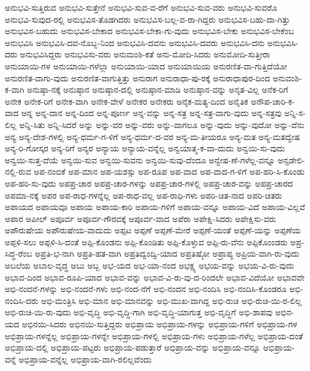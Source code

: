 {ಅನುಭವಿ-ಸುತ್ತಿರುವ
ಅನುಭವಿ-ಸುತ್ತೇನೆ
ಅನುಭವಿ-ಸುವ-ವ-ರೆಗೆ
ಅನುಭವಿ-ಸುವ-ವರು
ಅನುಭವಿ-ಸುವರೊ
ಅನುಭವಿ-ಸುವುದ-ರಲ್ಲಿ
ಅನುಭವಿಸ-ತೊಡಗಿದರು
ಅನುಭವಿಸ-ಬಲ್ಲ-ವ-ರಾ-ಗಿದ್ದರು
ಅನುಭವಿಸ-ಬಹು-ದಾ-ಗಿತ್ತು
ಅನುಭವಿಸ-ಬಹುದು
ಅನುಭವಿಸ-ಬೇಕಾದ
ಅನುಭವಿಸ-ಬೇಕಾ-ಗು-ವುದು
ಅನುಭವಿಸ-ಬೇಕು
ಅನುಭವಿಸ-ಬೇಕೆಂಬ
ಅನುಭವಿಸಿ
ಅನುಭವಿಸಿ-ದವ-ನೊಬ್ಬ-ನಿಂದ
ಅನುಭವಿಸಿ-ದವನು
ಅನುಭವಿಸಿ-ದವರು
ಅನುಭವಿಸಿ-ದನು
ಅನುಭವಿಸಿ-ದರು
ಅನುಭವಿಸಿದ್ದರು
ಅನುಭವಿಸು-ವರು
ಅನುಮಂಶಿ-ಕತೆ
ಅನು-ಮೋದಿ-ಸಿದರು
ಅನುಮೋದಿ-ಸುತ್ತೀರಾ
ಅನುಯಾಯಿ-ಗಳ
ಅನುಯಾಯಿ-ಗಳೆಲ್ಲಾ
ಅನುಯಾಯಿ-ಯಾದ
ಅನುಯಾಯಿಯ
ಅನುರಣಿತ-ವಾ-ಗುತ್ತಿದೆಯೋ
ಅನುರಣಿತ-ವಾಗು-ವುದು
ಅನುರಣಿತ-ವಾಗುತ್ತಿತ್ತು
ಅನುರಾಗ
ಅನುರಾಧಾ-ಪು-ರಕ್ಕೆ
ಅನುರಾಧಾಪುರ-ದಿಂದ
ಅನುವಂಶಿ-ಕ-ವಾಗಿ
ಅನುಷ್ಠಾ-ನಕ್ಕೆ
ಅನುಷ್ಠಾನ
ಅನುಷ್ಠಾನ-ದಲ್ಲಿ
ಅನುಷ್ಠಾನ-ಮಾಡಿ
ಅನುಷ್ಠಾನ-ವನ್ನು
ಅನೃತ-ವಿಲ್ಲ
ಅನೆಕ-ರಿಗೆ
ಅನೇಕ
ಅನೇಕ-ರಿಗೆ
ಅನೇಕ-ವಾಗಿ
ಅನೇಕ-ವೇಳೆ
ಅನೇಕರ
ಅನೇಕರು
ಅನೈಕ-ಮತ್ಯ-ದಿಂದ
ಅನೈತಿಕ
ಅನೌಪ-ಚಾರಿ-ಕ-ವಾದ
ಅನ್ನ
ಅನ್ನ-ದಾನ
ಅನ್ನ-ದಿಂದ
ಅನ್ನ-ಪೂರ್ಣ
ಅನ್ನ-ವನ್ನು
ಅನ್ನ-ಸತ್ರ
ಅನ್ನ-ಸತ್ರ-ವಾಗು-ವುದು
ಅನ್ನ-ಸತ್ರವು
ಅನ್ನಿ-ಸ-ಲಿಲ್ಲ
ಅನ್ನಿ-ಸಿತು
ಅನ್ನಿ-ಸಿದರೆ
ಅನ್ನು
ಅನ್ನು-ವರ
ಅನ್ನು-ವರು
ಅನ್ನು-ವಾಗಲೂ
ಅನ್ನು-ವುದು
ಅನ್ನು-ವುದೋ
ಅನ್ನು-ವೆನು
ಅನ್ಯ
ಅನ್ಯ-ದೇಶ-ಗಳಲ್ಲಿ
ಅನ್ಯ-ಧರ್ಮ-ಗ-ಳಿಗೆ
ಅನ್ಯ-ಧರ್ಮ-ದ-ವರ
ಅನ್ಯ-ಮ-ತೀಯರೂ
ಅನ್ಯ-ಮತ
ಅನ್ಯ-ಮತದ್ವೇಷ
ಅನ್ಯ-ರಿ-ಗೋಸ್ಕರ
ಅನ್ಯ-ರಿಗೆ
ಅನ್ಯರ
ಅನ್ಯಾಯ
ಅನ್ಯಾಯ-ವನ್ನೆಲ್ಲ
ಅನ್ವಯಾತ್ಮ-ಕ-ವಾ-ದುದು
ಅನ್ವಯಿ-ಸು-ವುದು
ಅನ್ವಯಿ-ಸುತ್ತ-ದೆಯೆ
ಅನ್ವಯಿ-ಸುವ
ಅನ್ವಯಿ-ಸುವನು
ಅನ್ವಯಿ-ಸುವು-ದೆಂದೂ
ಅನ್ವೇಷ-ಣೆ-ಗಳೆಲ್ಲ-ವನ್ನೂ
ಅನ್ಸಡೇಲಿ-ನಲ್ಲಿ-ರುವ
ಅಪ-ನಂಬಿಕೆ
ಅಪ-ಮಾನ
ಅಪ-ಯಶಸ್ಸು
ಅಪ-ರೂಪ
ಅಪ-ವಾದ
ಅಪ-ವಾದ-ಗ-ಳಿಗೆ
ಅಪ-ಹರಿ-ಸಿ-ಕೊಂಡು
ಅಪ-ಹರಿ-ಸು-ವುದು
ಅಪಪ್ರ-ಚಾರ
ಅಪಪ್ರ-ಚಾರ-ಗಳನ್ನು
ಅಪಪ್ರ-ಚಾರ-ಗಳಲ್ಲಿ
ಅಪಪ್ರ-ಚಾರ-ವನ್ನು
ಅಪಪ್ರ-ಚಾರದ
ಅಪಮಾ-ನಕ್ಕೆ
ಅಪರ
ಅಪ-ರಾಧ-ಗಳನ್ನೆಲ್ಲ
ಅಪ-ರಾಧ-ವಲ್ಲ
ಅಪ-ರಾಧಿ-ಗಳು
ಅಪರಿ-ಚಿತ-ನಾದ
ಅಪರಿ-ಚಿತರು
ಅಪಾಯದ
ಅಪಾಯವೂ
ಅಪಾಯ
ಅಪಾಯ-ಕಾರಿ
ಅಪಾಯ-ಗಳಿಗೆ
ಅಪಾಯ-ವನ್ನೂ
ಅಪಾಯ-ವಿದೆ
ಅಪಾಯ-ವಿಲ್ಲವೆ
ಅಪಾರ
ಅಪೀಲ್
ಅಪೂರ್ವ
ಅಪೂರ್ವ-ಗೌರವಕ್ಕೆ
ಅಪೂರ್ವ-ವಾದ
ಅಪೆರಾ
ಅಪೇಕ್ಷಿ-ಸಿದರು
ಅಪೇಕ್ಷಿಸು-ವರು
ಅಪೌರುಷೇಯ
ಅಪೌರುಷೇಯ-ವಾದುದು
ಅಪ್ಪಟ
ಅಪ್ಪಣೆ
ಅಪ್ಪಣೆ-ಮೇರೆ
ಅಪ್ಪಣೆ-ಯಂತೆ
ಅಪ್ಪಣೆ-ಯನ್ನು
ಅಪ್ಪಣೆಯ
ಅಪ್ಪಳಿ-ಸಲು
ಅಪ್ಪಳಿ-ಸಿ-ದಂತೆ
ಅಪ್ಪಿ-ಕೊಂಡನು
ಅಪ್ಪಿ-ಕೊಂಡಿತು
ಅಪ್ಪಿ-ಕೊಳ್ಳುವ
ಅಪ್ಪಿ-ರು-ವೆನು
ಅಪ್ಪಿಕೊಂಂಡರು
ಅಪ್ರ-ಸಿದ್ಧ-ರೆಂಬ
ಅಪ್ರತಿ-ಭ-ನಾಗಿ
ಅಪ್ರತಿ-ಹತ-ವಾಗಿ
ಅಪ್ರತಿದ್ವಂದ್ವಿ-ಯಾದ
ಅಪ್ರತಿಷ್ಠೋ
ಅಪ್ರಾಪ್ಯ
ಅಪ್ರಿಯ-ವಾಗಿ-ರು-ವುದು
ಅಬಲೆಯ
ಅಬಾಲ-ವೃದ್ಧ
ಅಬು
ಅಬ್ಬ
ಅಭ-ಯದ
ಅಭ-ಯಾ-ನಂದ
ಅಭಕ್ಷ್ಯ
ಅಭಯ-ವನ್ನು
ಅಭಯ-ವಿ-ರು-ವುದು
ಅಭಾವ-ದಿಂದ
ಅಭಾವ-ರೂಪಿ-ಯಾದ
ಅಭಾವ-ವನ್ನು
ಅಭಾವ-ವಿ-ರು-ವು-ದ-ರಿಂದಲೇ
ಅಭಾವ-ವಿದೆಯೋ
ಅಭಾವವೇ
ಅಭಿ-ನಂದನೆ-ಗಳನ್ನು
ಅಭಿ-ನಂದನೆ-ಗಳು
ಅಭಿ-ನಂದ-ನೆಗೆ
ಅಭಿ-ನಂದನ
ಅಭಿ-ನಂದಿಸಿ
ಅಭಿ-ನಂದಿಸಿ-ಕೊಂಡರೂ
ಅಭಿ-ನಂದಿಸಿ-ದರು
ಅಭಿ-ಮಂತ್ರಿಸಿ
ಅಭಿ-ಮಾನ
ಅಭಿ-ಮಾನವನ್ನು
ಅಭಿ-ಮುಖ-ವಾಗಿದ್ದ
ಅಭಿ-ರುಚಿ
ಅಭಿ-ರುಚಿ-ಯಿ-ರ-ಲಿಲ್ಲ
ಅಭಿ-ರುಚಿ-ಯಿ-ರು-ವುದು
ಅಭಿ-ವೃದ್ಧಿ
ಅಭಿ-ವೃದ್ಧಿ-ಗಾಗಿ
ಅಭಿ-ವೃದ್ಧಿ-ಯಾಗುತ್ತ
ಅಭಿ-ವೃದ್ಧಿಗೆ
ಅಭಿ-ಶಾಪವು
ಅಭಿನ-ಯದ
ಅಭಿನಯಿ-ಸಿದರು
ಅಭಿನಯಿ-ಸುತ್ತಿದ್ದರು
ಅಭಿಪ್ರಾಯ
ಅಭಿಪ್ರಾಯ-ಗಳನ್ನು
ಅಭಿಪ್ರಾಯ-ಗಳಿಗೆ
ಅಭಿಪ್ರಾಯ-ಗಳ
ಅಭಿಪ್ರಾಯ-ಗಳನ್ನೆಲ್ಲ
ಅಭಿಪ್ರಾಯ-ಗಳನ್ನೇ
ಅಭಿಪ್ರಾಯ-ಗಳಲ್ಲಿ
ಅಭಿಪ್ರಾಯ-ಗಳು
ಅಭಿಪ್ರಾಯ-ಗಳೆಲ್ಲ
ಅಭಿಪ್ರಾಯ-ದಂತೆ
ಅಭಿಪ್ರಾಯ-ದಲ್ಲಿ
ಅಭಿಪ್ರಾಯ-ಪಟ್ಟರು
ಅಭಿಪ್ರಾಯ-ಪಡುತ್ತಾರೆ
ಅಭಿಪ್ರಾಯ-ವನ್ನು
ಅಭಿಪ್ರಾಯ-ವನ್ನೂ
ಅಭಿಪ್ರಾಯ-ವನ್ನೆ
ಅಭಿಪ್ರಾಯ-ವನ್ನೆಲ್ಲ
ಅಭಿಪ್ರಾಯ-ವಾಗಿ-ರಲಿಲ್ಲವೆಂದು
}
